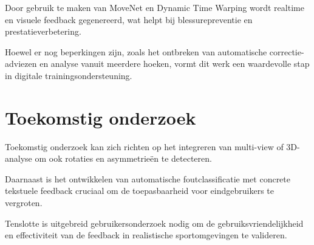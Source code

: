 \documentclass[a0,portrait]{hogent-poster}
\begin{document}
\begin{multicols}{2}
Door gebruik te maken van MoveNet en Dynamic Time Warping wordt realtime en visuele feedback gegenereerd, wat helpt bij blessurepreventie en prestatieverbetering. 

Hoewel er nog beperkingen zijn, zoals het ontbreken van automatische correctie-adviezen en analyse vanuit meerdere hoeken, vormt dit werk een waardevolle stap in digitale trainingsondersteuning.

\section{Toekomstig onderzoek}

Toekomstig onderzoek kan zich richten op het integreren van multi-view of 3D-analyse om ook rotaties en asymmetrieën te detecteren. 

Daarnaast is het ontwikkelen van automatische foutclassificatie met concrete tekstuele feedback cruciaal om de toepasbaarheid voor eindgebruikers te vergroten. 

Tenslotte is uitgebreid gebruikersonderzoek nodig om de gebruiksvriendelijkheid en effectiviteit van de feedback in realistische sportomgevingen te valideren.

\end{multicols}
\end{document}
